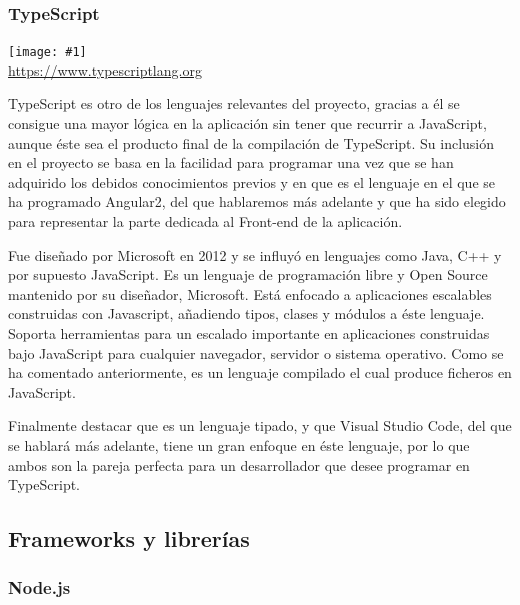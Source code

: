 \documentclass[11pt,openany]{book}
\newcommand{\logo}[2]{\medskip\begin{center}\texttt{[image: \#1]}\\\scriptsize\url{#2}\end{center}\bigskip}
\begin{document}
\subsubsection{TypeScript}

\logo{logos/typescript.png}{https://www.typescriptlang.org}

TypeScript es otro de los lenguajes relevantes del proyecto, gracias a él se consigue una mayor lógica en la aplicación sin tener que recurrir a JavaScript, aunque éste sea el producto final de la compilación de TypeScript. Su inclusión en el proyecto se basa en la facilidad para programar una vez que se han adquirido los debidos conocimientos previos y en que es el lenguaje en el que se ha programado Angular2, del que hablaremos más adelante y que ha sido elegido para representar la parte dedicada al Front-end de la aplicación.

Fue diseñado por Microsoft en 2012 y se influyó en lenguajes como Java, C++ y por supuesto JavaScript\cite{2}. Es un lenguaje de programación libre y Open Source mantenido por su diseñador, Microsoft. Está enfocado a aplicaciones escalables construidas con Javascript, añadiendo tipos, clases y módulos a éste lenguaje. Soporta herramientas para un escalado importante en aplicaciones construidas bajo JavaScript para cualquier navegador, servidor o sistema operativo. Como se ha comentado anteriormente, es un lenguaje compilado el cual produce ficheros en JavaScript.

Finalmente destacar que es un lenguaje tipado, y que Visual Studio Code, del que se hablará más adelante, tiene un gran enfoque en éste lenguaje, por lo que ambos son la pareja perfecta para un desarrollador que desee programar en TypeScript.


\subsection{Frameworks y librerías}

\subsubsection{Node.js}
\end{document}
